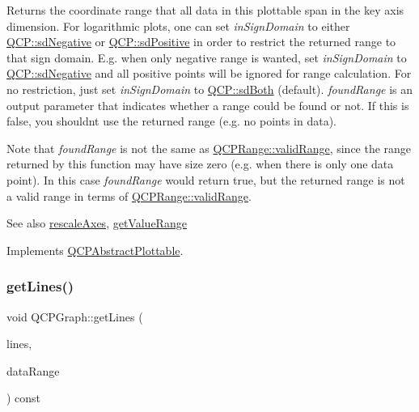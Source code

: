 Returns the coordinate range that all data in this plottable span in the key axis dimension. For logarithmic plots, one can set {\itshape in\+Sign\+Domain} to either \mbox{\hyperlink{namespace_q_c_p_afd50e7cf431af385614987d8553ff8a9a2d18af0bc58f6528d1e82ce699fe4829}{Q\+C\+P\+::sd\+Negative}} or \mbox{\hyperlink{namespace_q_c_p_afd50e7cf431af385614987d8553ff8a9a584784b75fb816abcc627cf743bb699f}{Q\+C\+P\+::sd\+Positive}} in order to restrict the returned range to that sign domain. E.\+g. when only negative range is wanted, set {\itshape in\+Sign\+Domain} to \mbox{\hyperlink{namespace_q_c_p_afd50e7cf431af385614987d8553ff8a9a2d18af0bc58f6528d1e82ce699fe4829}{Q\+C\+P\+::sd\+Negative}} and all positive points will be ignored for range calculation. For no restriction, just set {\itshape in\+Sign\+Domain} to \mbox{\hyperlink{namespace_q_c_p_afd50e7cf431af385614987d8553ff8a9aa38352ef02d51ddfa4399d9551566e24}{Q\+C\+P\+::sd\+Both}} (default). {\itshape found\+Range} is an output parameter that indicates whether a range could be found or not. If this is false, you shouldn\textquotesingle{}t use the returned range (e.\+g. no points in data).

Note that {\itshape found\+Range} is not the same as \mbox{\hyperlink{class_q_c_p_range_ab38bd4841c77c7bb86c9eea0f142dcc0}{Q\+C\+P\+Range\+::valid\+Range}}, since the range returned by this function may have size zero (e.\+g. when there is only one data point). In this case {\itshape found\+Range} would return true, but the returned range is not a valid range in terms of \mbox{\hyperlink{class_q_c_p_range_ab38bd4841c77c7bb86c9eea0f142dcc0}{Q\+C\+P\+Range\+::valid\+Range}}.

\begin{DoxySeeAlso}{See also}
\mbox{\hyperlink{class_q_c_p_abstract_plottable_a1491c4a606bccd2d09e65e11b79eb882}{rescale\+Axes}}, \mbox{\hyperlink{class_q_c_p_graph_a8f773e56f191a61c06e129e90a604d77}{get\+Value\+Range}} 
\end{DoxySeeAlso}


Implements \mbox{\hyperlink{class_q_c_p_abstract_plottable_a4da16d3cd4b509e1104a9b0275623c96}{Q\+C\+P\+Abstract\+Plottable}}.

\mbox{\label{class_q_c_p_graph_a563c6da2126300a4d9d2bdee30dad040}} 
\subsubsection{\texorpdfstring{getLines()}{getLines()}}
{\footnotesize\ttfamily void Q\+C\+P\+Graph\+::get\+Lines (\begin{DoxyParamCaption}\item[{Q\+Vector$<$ Q\+PointF $>$ $\ast$}]{lines,  }\item[{const \mbox{\hyperlink{class_q_c_p_data_range}{Q\+C\+P\+Data\+Range}} \&}]{data\+Range }\end{DoxyParamCaption}) const\hspace{0.3cm}{\ttfamily [protected]}}

